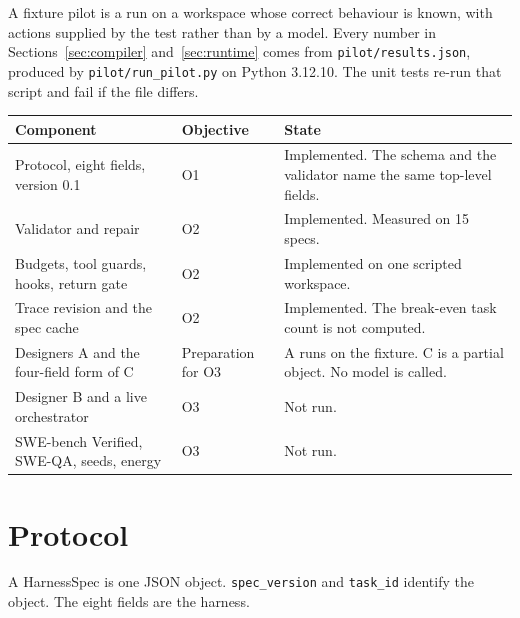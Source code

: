 \documentclass[10pt,a4paper]{article}
\begin{document}
A fixture pilot is a run on a workspace whose correct behaviour is known, with actions supplied by the test rather than by a model. Every number in Sections~\ref{sec:compiler} and~\ref{sec:runtime} comes from \texttt{pilot/results.json}, produced by \texttt{pilot/run\_pilot.py} on Python 3.12.10. The unit tests re-run that script and fail if the file differs.

\begin{table}[H]
\centering
\small
\begin{tabularx}{\textwidth}{@{}YlY@{}}
\toprule
Component & Objective & State \\
\midrule
Protocol, eight fields, version 0.1 & O1 & Implemented. The schema and the validator name the same top-level fields. \\
Validator and repair & O2 & Implemented. Measured on 15 specs. \\
Budgets, tool guards, hooks, return gate & O2 & Implemented on one scripted workspace. \\
Trace revision and the spec cache & O2 & Implemented. The break-even task count is not computed. \\
Designers A and the four-field form of C & Preparation for O3 & A runs on the fixture. C is a partial object. No model is called. \\
Designer B and a live orchestrator & O3 & Not run. \\
SWE-bench Verified, SWE-QA, seeds, energy & O3 & Not run. \\
\bottomrule
\end{tabularx}
\end{table}

\section{Protocol}

A HarnessSpec is one JSON object. \texttt{spec\_version} and \texttt{task\_id} identify the object. The eight fields are the harness.
\end{document}
